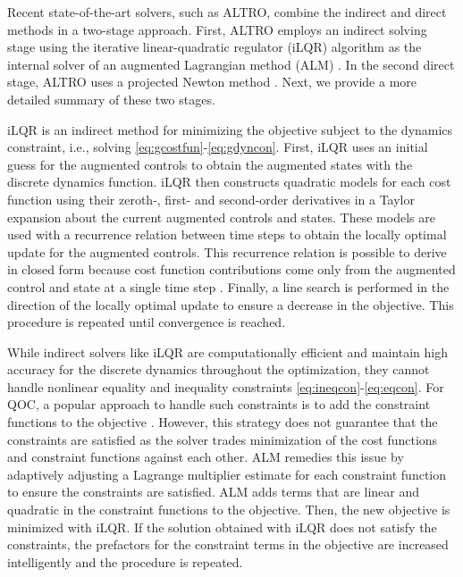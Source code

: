 \documentclass[
  amsfonts,
  amsmath,
  amssymb,
  pra,
  twocolumn,
  superscriptaddress,
]{revtex4-2}
\begin{document}
Recent state-of-the-art solvers, such as ALTRO,
combine the indirect and direct methods in a two-stage approach.
First, ALTRO employs an indirect solving stage using
the iterative linear-quadratic regulator (iLQR) algorithm
\cite{Li2004a} as the internal solver of an augmented Lagrangian method (ALM)
\cite{lantoine2012hybrid, plancher2017constrained, nocedal2006numerical}.
In the second direct stage, ALTRO uses a projected Newton method
\cite{bertsekas1982projected, rao1998application}.
Next, we provide a more detailed summary of these two stages.

iLQR is an indirect method
for minimizing the objective subject to the dynamics constraint,
i.e., solving \eqref{eq:gcostfun}-\eqref{eq:gdyncon}.
First, iLQR uses an initial guess for the augmented controls to obtain the 
augmented states with the discrete dynamics function.
iLQR then constructs quadratic models for each cost function using
their zeroth-, first- and second-order derivatives in a Taylor expansion
about the current augmented controls and states.
These models are used with a recurrence relation between time steps
to obtain the locally optimal update for the augmented controls.
This recurrence relation is possible to derive in closed
form because cost function contributions come only from the augmented
control and state at a single time step \cite{mayne1966a}.
Finally, a line search \cite{zhang2006global}
is performed in the direction of the locally optimal update to ensure a
decrease in the objective.
This procedure is repeated until convergence is reached.

While indirect solvers like iLQR are computationally
efficient and maintain high accuracy for the discrete dynamics
throughout the optimization, they cannot handle
nonlinear equality and inequality
constraints \eqref{eq:ineqcon}-\eqref{eq:eqcon}.
For QOC, a popular approach to handle such constraints
is to add the constraint functions to the objective
\cite{heeres2017implementing, leung2017speedup, reinhold2019controlling, niu2019universal}.
However, this strategy does not guarantee that the constraints
are satisfied as the solver trades
minimization of the cost functions and constraint functions against each other.
ALM remedies this issue by adaptively adjusting a Lagrange multiplier estimate
for each constraint function to ensure the constraints are satisfied.
ALM adds terms that are linear and quadratic in the constraint functions
to the objective. Then, the new objective is minimized with
iLQR. If the solution obtained with iLQR does not satisfy the constraints,
the prefactors for the constraint terms in the objective are increased
intelligently and the procedure is repeated.
\end{document}
